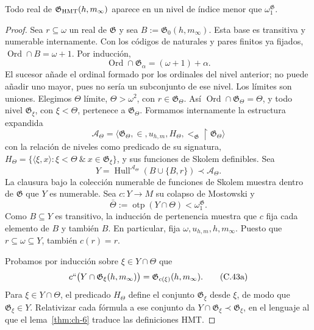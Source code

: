 \begin{lemma}
\label{thm:ch-8}
Todo real de
\(\mathfrak G_{\rm HMT}(h,m_\infty)\) aparece en un nivel de índice menor que
\(\omega_1^{\mathfrak G}\).

\end{lemma}
\begin{proof}
Sea \(r\subseteq\omega\) un real de \(\mathfrak G\) y sea
\(B:=\mathfrak G_0(h,m_\infty)\). Esta base es transitiva y numerable
internamente. Con los códigos de naturales y pares finitos ya fijados,
\(\operatorname{Ord}\cap B=\omega+1\). Por inducción,
\[
 \operatorname{Ord}\cap\mathfrak G_\alpha=(\omega+1)+\alpha.
\]
El sucesor añade el ordinal formado por los ordinales del nivel anterior;
no puede añadir uno mayor, pues no sería un subconjunto de ese nivel. Los
límites son uniones. Elegimos \(\Theta\) límite, \(\Theta>\omega^2\),
con \(r\in\mathfrak G_\Theta\). Así
\(\operatorname{Ord}\cap\mathfrak G_\Theta=\Theta\), y todo nivel
\(\mathfrak G_\xi\), con \(\xi<\Theta\), pertenece a
\(\mathfrak G_\Theta\). Formamos internamente la estructura expandida
\[
 \mathcal A_\Theta=
 \langle\mathfrak G_\Theta,\in,u_{h,m},
         H_\Theta,<_{\mathfrak G}\!\upharpoonright\mathfrak G_\Theta\rangle
\]
con la relación de niveles como predicado de su signatura,
\(H_\Theta=\{\langle\xi,x\rangle:\xi<\Theta\ \&\
x\in\mathfrak G_\xi\}\), y sus funciones de Skolem definibles. Sea
\[
 Y=\operatorname{Hull}^{\mathcal A_\Theta}
   (B\cup\{B,r\})\prec\mathcal A_\Theta .
\]
La clausura bajo la colección numerable de funciones de Skolem muestra dentro
de \(\mathfrak G\) que \(Y\) es numerable. Sea
\(c:Y\rightarrow M\) su colapso de Mostowski y
\[
 \bar\Theta:=\operatorname{otp}(Y\cap\Theta)
 <\omega_1^{\mathfrak G}.
\]
Como \(B\subseteq Y\) es transitivo, la inducción de pertenencia muestra
que \(c\) fija cada elemento de \(B\) y también \(B\). En particular,
fija \(\omega,u_{h,m},h,m_\infty\). Puesto que
\(r\subseteq\omega\subseteq Y\), también \(c(r)=r\).

Probamos por inducción sobre \(\xi\in Y\cap\Theta\) que
\[
 c``\bigl(Y\cap\mathfrak G_\xi(h,m_\infty)\bigr)
 =\mathfrak G_{c(\xi)}(h,m_\infty).
\tag{C.43a}\label{eq:ch-condensacion}
\]
Para \(\xi\in Y\cap\Theta\), el predicado \(H_\Theta\) define el
conjunto \(\mathfrak G_\xi\) desde \(\xi\), de modo que
\(\mathfrak G_\xi\in Y\). Relativizar cada fórmula a ese conjunto da
\(Y\cap\mathfrak G_\xi\prec\mathfrak G_\xi\), en el lenguaje al que
el lema~\ref{thm:ch-6} traduce las definiciones HMT.


\end{proof}
